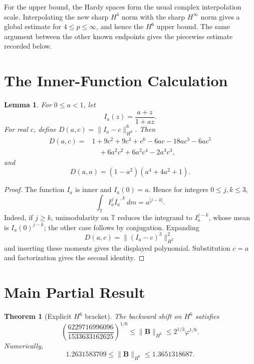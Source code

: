 \documentclass[11pt]{article}
\newtheorem{theorem}{Theorem}
\newtheorem{lemma}{Lemma}
\newcommand{\T}{\mathbb T}
\newcommand{\dm}{\,dm}
\newcommand{\Bop}{\mathbf B}
\begin{document}
For the upper bound, the Hardy spaces form the usual complex interpolation
scale.  Interpolating the new sharp $H^4$ norm with the sharp $H^\infty$ norm
gives a global estimate for $4\le p\le\infty$, and hence the $H^6$ upper
bound.  The same argument between the other known endpoints gives the
piecewise estimate recorded below.

\section*{The Inner-Function Calculation}

\begin{lemma}\label{lem:moments}
For $0\le a<1$, let
\[
  I_a(z)=\frac{a+z}{1+az}.
\]
For real $c$, define $D(a,c)=\|I_a-c\|_{H^6}^6$.  Then
\begin{align*}
D(a,c)={}&1+9c^2+9c^4+c^6-6ac-18ac^3-6ac^5\\
&\quad+6a^2c^2+6a^2c^4-2a^3c^3,
\end{align*}
and
\[
  D(a,a)=(1-a^2)(a^4+4a^2+1).
\]
\end{lemma}

\begin{proof}
The function $I_a$ is inner and $I_a(0)=a$.  Hence for integers
$0\le j,k\le3$,
\[
 \int_{\T}I_a^j\overline{I_a}^{,k}\dm=a^{|j-k|}.
\]
Indeed, if $j\ge k$, unimodularity on $\T$ reduces the integrand to
$I_a^{j-k}$, whose mean is $I_a(0)^{j-k}$; the other case follows by
conjugation.  Expanding
\[
  D(a,c)=\|(I_a-c)^3\|_{H^2}^2
\]
and inserting these moments gives the displayed polynomial.  Substitution
$c=a$ and factorization gives the second identity.
\end{proof}

\section*{Main Partial Result}

\begin{theorem}[Explicit $H^6$ bracket]\label{thm:h6}
The backward shift on $H^6$ satisfies
\[
 \left(\frac{6229716996096}{1533633162625}\right)^{1/6}
 \le \|\Bop\|_{H^6}
 \le 2^{1/3}\varphi^{1/6}.
\]
Numerically,
\[
  1.2631583709 \le \|\Bop\|_{H^6}\le1.3651318687.
\]
\end{theorem}
\end{document}
